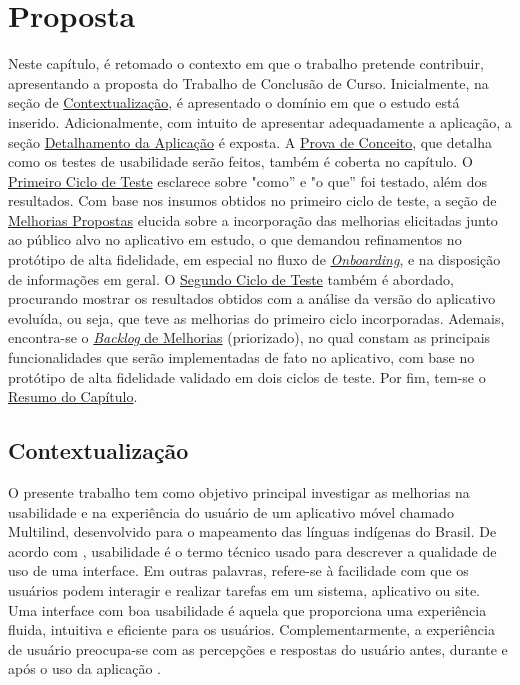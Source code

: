 \chapter[Proposta]{Proposta}
\label{chap:Proposta}
Neste capítulo, é retomado o contexto em que o trabalho pretende contribuir, apresentando a proposta do Trabalho de Conclusão de Curso. Inicialmente, na seção de \hyperref[sec:Contextualização]{Contextualização}, é 
apresentado o domínio em que o estudo está inserido. Adicionalmente, com intuito de apresentar adequadamente a aplicação, a seção \hyperref[sec:Detalhamento da Aplicacao]{Detalhamento da Aplicação} é exposta. A \hyperref[sec:Prova de Conceito]{Prova de Conceito}, 
que detalha como os testes de usabilidade serão  feitos, também é coberta no capítulo. O \hyperref[sec:Primeiro Ciclo]{Primeiro Ciclo de Teste} esclarece sobre "como'' e "o que'' foi testado, além dos resultados. Com base nos insumos obtidos no primeiro ciclo de teste, 
a seção de \hyperref[sec:Melhorias Propostas]{Melhorias Propostas} elucida sobre a incorporação das melhorias elicitadas junto ao público alvo no aplicativo em estudo, o que demandou refinamentos no protótipo de alta fidelidade, em especial no fluxo de \hyperref[sec:Onboarding]{\textit{Onboarding}}, 
e na disposição de informações em geral. O \hyperref[sec:Segundo Ciclo]{Segundo Ciclo de Teste} também é abordado, procurando mostrar os resultados obtidos com a análise da versão do aplicativo evoluída, ou seja, que teve as melhorias do primeiro ciclo incorporadas. 
Ademais, encontra-se o \hyperref[sec:Backlog]{\textit{Backlog} de Melhorias} (priorizado), no qual constam as principais funcionalidades que serão implementadas de fato no aplicativo, com base no protótipo de alta fidelidade validado em dois ciclos de teste. 
Por fim, tem-se o \hyperref[sec:Resumo Proposta]{Resumo do Capítulo}.

\section{Contextualização}
\label{sec:Contextualizacao}
O presente trabalho tem como objetivo principal investigar as melhorias na usabilidade e na experiência do usuário de um aplicativo móvel chamado Multilind, desenvolvido para o mapeamento das línguas indígenas do Brasil. 
De acordo com , usabilidade é o termo técnico usado para descrever a qualidade de uso de uma interface. Em outras palavras, refere-se à facilidade com que os usuários podem interagir e realizar 
tarefas em um sistema, aplicativo ou site. Uma interface com boa usabilidade é aquela que proporciona uma experiência fluida, intuitiva e eficiente para os usuários. Complementarmente, a experiência de usuário preocupa-se 
com as percepções e respostas do usuário antes, durante e após o uso da aplicação \cite{iso9241210}.

